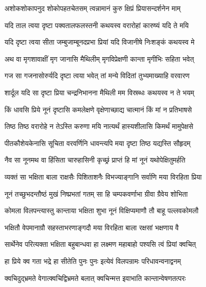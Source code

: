 \twolineshloka
{अशोकशोकापनुद शोकोपहतचेतसम्}
{त्वन्नामानं कुरु क्षिप्रं प्रियासन्दर्शनेन माम्} %

\twolineshloka
{यदि ताल त्वया दृष्टा पक्वतालफलस्तनी}
{कथयस्व वरारोहां कारुष्यं यदि ते मयि} %

\twolineshloka
{यदि दृष्टा त्वया सीता जम्बुजाम्बूनदप्रभा}
{प्रियां यदि विजानीषे निःशङ्कं कथयस्व मे} %

\twolineshloka
{अथ वा मृगशावाक्षीं मृग जानासि मैथिलीम्}
{मृगविप्रेक्षणी कान्ता मृगीभिः सहिता भवेत्} %

\twolineshloka
{गज सा गजनासोरुर्यदि दृष्टा त्वया भवेत्}
{तां मन्ये विदितां तुभ्यमाख्याहि वरवारण} %

\twolineshloka
{शार्दूल यदि सा दृष्टा प्रिया चन्द्रनिभानना}
{मैथिली मम विस्रब्धः कथयस्व न ते भयम्} %

\twolineshloka
{किं धावसि प्रिये नूनं दृष्टासि कमलेक्षणे}
{वृक्षेणाच्छाद्य चात्मानं किं मां न प्रतिभाषसे} %

\twolineshloka
{तिष्ठ तिष्ठ वरारोहे न तेऽस्ति करुणा मयि}
{नात्यर्थं हास्यशीलासि किमर्थं मामुपेक्षसे} %

\twolineshloka
{पीतकौशेयकेनासि सूचिता वरवर्णिनि}
{धावन्त्यपि मया दृष्टा तिष्ठ यद्यस्ति सौहृदम्} %

\twolineshloka
{नैव सा नूनमथ वा हिंसिता चारुहासिनी}
{कृच्छ्रं प्राप्तं हि मां नूनं यथोपेक्षितुमर्हति} %

\twolineshloka
{व्यक्तं सा भक्षिता बाला राक्षसैः पिशिताशनैः}
{विभज्याङ्गानि सर्वाणि मया विरहिता प्रिया} %

\twolineshloka
{नूनं तच्छुभदन्तौष्ठं मुखं निष्प्रभतां गतम्}
{सा हि चम्पकवर्णाभा ग्रीवा ग्रैवेय शोभिता} %

\twolineshloka
{कोमला विलपन्त्यास्तु कान्ताया भक्षिता शुभा}
{नूनं विक्षिप्यमाणौ तौ बाहू पल्लवकोमलौ} %

\twolineshloka
{भक्षितौ वेपमानाग्रौ सहस्ताभरणाङ्गदौ}
{मया विरहिता बाला रक्षसां भक्षणाय वै} %

\twolineshloka
{सार्थेनेव परित्यक्ता भक्षिता बहुबान्धवा}
{हा लक्ष्मण महाबाहो पश्यसि त्वं प्रियां क्वचित्} %

\twolineshloka
{हा प्रिये क्व गता भद्रे हा सीतेति पुनः पुनः}
{इत्येवं विलपन्रामः परिधावन्वनाद्वनम्} %

\twolineshloka
{क्वचिदुद्भ्रमते वेगात्क्वचिद्विभ्रमते बलात्}
{क्वचिन्मत्त इवाभाति कान्तान्वेषणतत्परः} %

